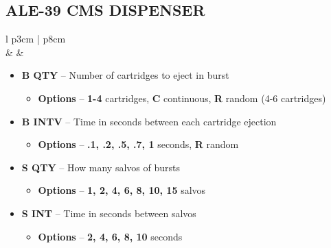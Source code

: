 \documentclass[fontHelvetica]{TechCheck}
\begin{document}
	\subsection{ALE-39 CMS DISPENSER}
	\begin{center}
		\begin{longtable}{l p{3cm} | p{8cm}}
			\toprule
			 \\
			\midrule
			\textbf{\textbullet} &  &
			\begin{minipage}[t]{\linewidth}
				\vspace{-7pt}
				\begin{itemize}
					\item \textbf{B QTY} -- Number of cartridges to eject in burst
					\begin{itemize}
						\item \textbf{Options} -- \textbf{1-4} cartridges, \textbf{C} continuous, \textbf{R} random (4-6 cartridges)
					\end{itemize}
					\item \textbf{B INTV} -- Time in seconds between each cartridge ejection
					\begin{itemize}
						\item \textbf{Options} -- \textbf{.1, .2, .5, .7, 1} seconds, \textbf{R} random
					\end{itemize}
					\item \textbf{S QTY} -- How many salvos of bursts
					\begin{itemize}
						\item \textbf{Options} -- \textbf{1, 2, 4, 6, 8, 10, 15} salvos
					\end{itemize}
					\item \textbf{S INT} -- Time in seconds between salvos
					\begin{itemize}
						\item \textbf{Options} -- \textbf{2, 4, 6, 8, 10} seconds
					\end{itemize}
				\end{itemize}
			\end{minipage} \\
			\bottomrule
		\end{longtable}
	\end{center}

\end{document}
